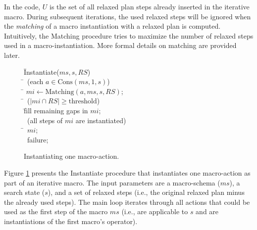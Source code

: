 \documentclass{article}
\begin{document}
In the code, $U$ is the set of all relaxed plan steps already inserted in the iterative macro.
During subsequent iterations, the used relaxed steps will be ignored
when the \emph{matching} of a macro instantiation
with a relaxed plan is computed.
Intuitively, the Matching procedure tries to maximize the number of
relaxed steps used in a macro-instantiation.
More formal details on matching are provided later.

\begin{figure}[t]
\begin{center}
\begin{minipage}[c]{\textwidth}
\footnotesize{
\begin{tabbing}
\hspace{0.0em} \= Instantiate($\textit{ms}, s, \textit{RS}$) \\ %
\> \quad \= \for \ (each $a \in \mbox{Cons}(\textit{ms}, 1, s)$) \\ %
\> \> \quad \= $\textit{mi} \leftarrow \mbox{Matching}(a, \textit{ms}, s, \textit{RS})$; \\
\> \> \quad \= \myif \ ($|\textit{mi} \cap \textit{RS}| \geq \mbox{threshold}$) \\ %
\> \> \> \quad \= fill remaining gaps in $\textit{mi}$; \\
\> \> \> \> \myif \ (all steps of $\textit{mi}$ are instantiated) \\
\> \> \> \> \quad \= \return \ $\textit{mi}$; \\
\> \>  \return \ failure; %
\end{tabbing}
}
\end{minipage}
\end{center}
\caption{Instantiating one macro-action.}
\label{fig:instantiation}
\end{figure}

Figure \ref{fig:instantiation} presents the Instantiate procedure
that instantiates one macro-action as part of an iterative macro.
The input parameters are a macro-schema ($\textit{ms}$), a search state ($s$),
and a set of relaxed steps
(i.e., the original relaxed plan minus the already used steps).
The main loop iterates through all actions that could be used as 
the first step of the macro $\textit{ms}$
(i.e., are applicable to $s$ and are instantiations of the first macro's operator).
\end{document}
